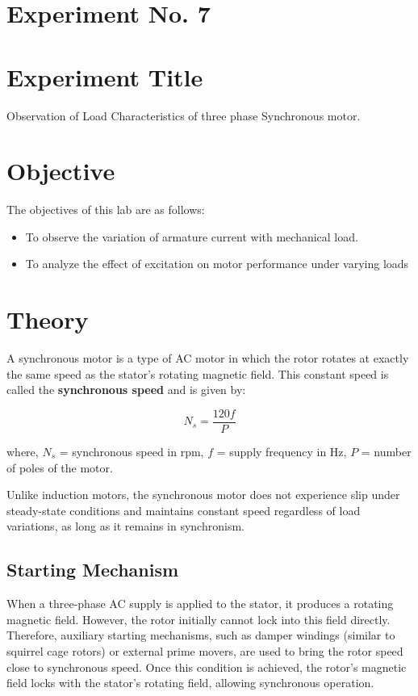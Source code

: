 \documentclass[a4paper,12pt]{article}
\begin{document}
	\section{Experiment No. 7}
	
	\section{Experiment Title }
	Observation of Load Characteristics of three phase Synchronous motor.
	
	\section{Objective}
	
	The objectives of this lab are as follows:
	\begin{itemize}
		\item 	To observe the variation of armature current with mechanical load.
		\item 	To analyze the effect of excitation on motor performance under varying loads
		
		
		
	\end{itemize}
	
	\section{Theory}
	
	
A synchronous motor is a type of AC motor in which the rotor rotates at exactly the same speed as the stator's rotating magnetic field. This constant speed is called the \textbf{synchronous speed} and is given by:

\begin{equation}
	N_s = \frac{120f}{P}
\end{equation}

where,  
$N_s$ = synchronous speed in rpm,  
$f$ = supply frequency in Hz,  
$P$ = number of poles of the motor.

Unlike induction motors, the synchronous motor does not experience slip under steady-state conditions and maintains constant speed regardless of load variations, as long as it remains in synchronism.

\subsection*{Starting Mechanism}

When a three-phase AC supply is applied to the stator, it produces a rotating magnetic field. However, the rotor initially cannot lock into this field directly. Therefore, auxiliary starting mechanisms, such as damper windings (similar to squirrel cage rotors) or external prime movers, are used to bring the rotor speed close to synchronous speed. Once this condition is achieved, the rotor's magnetic field locks with the stator's rotating field, allowing synchronous operation.
\end{document}

